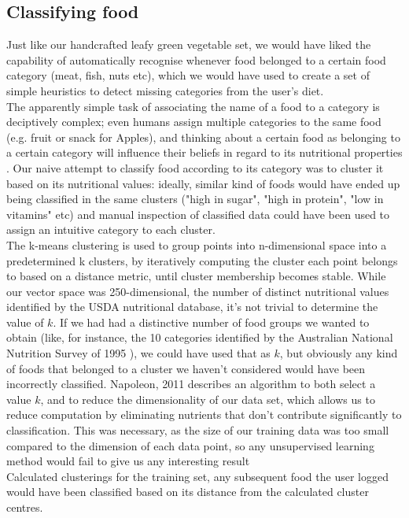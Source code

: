 \subsection{Classifying food}
Just like our handcrafted leafy green vegetable set, we would have liked the capability of automatically recognise whenever food belonged to a certain food category (meat, fish, nuts etc), which we would have used to create a set of simple heuristics to detect missing categories from the user's diet. \\
The apparently simple task of associating the name of a food to a category is deciptively complex; even humans assign multiple categories to the same food (e.g. fruit or snack for Apples), and thinking about a certain food as belonging to a certain category will influence their beliefs in regard to its nutritional properties \cite{Hayes2011}.
Our naive attempt to classify food  according to its category was to cluster it based on its nutritional values: ideally, similar kind of foods would have ended up being classified in the same clusters ("high in sugar", "high in protein", "low in vitamins" etc) and manual inspection of classified data could have been used to assign an intuitive category to each cluster. \\
The k-means clustering is used to group points into n-dimensional space into a predetermined k clusters, by iteratively computing the cluster each point belongs to based on a distance metric, until cluster membership becomes stable. While our vector space was 250-dimensional, the number of distinct nutritional values identified by the USDA nutritional database, it's not trivial to determine the value of $k$. If we had had a distinctive number of food groups we wanted to obtain (like, for instance, the 10 categories identified by the Australian National Nutrition Survey of 1995 \cite{NNS1995}), we could have used that as $k$, but obviously any kind of foods that belonged to a cluster we haven't considered would have been incorrectly classified. Napoleon, 2011 \cite{napoleon} describes an algorithm to both select a value $k$, and to reduce the dimensionality of our data set, which allows us to reduce computation by eliminating nutrients that don't contribute significantly to classification. This was necessary, as the size of our training data was too small compared to the dimension of each data point, so any unsupervised learning method would fail to give us any interesting result \cite{} \\
Calculated clusterings for the training set, any subsequent food the user logged would have been classified based on its distance from the calculated cluster centres.
